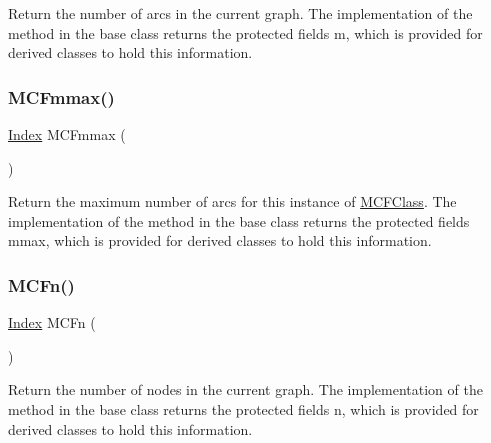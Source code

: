 Return the number of arcs in the current graph. The implementation of the method in the base class returns the protected fields {\ttfamily m}, which is provided for derived classes to hold this information. \mbox{\label{class_m_c_f_class_af63cff04d49de9f84b9ddc8585334690}} 
\subsubsection{\texorpdfstring{M\+C\+Fmmax()}{MCFmmax()}}
{\footnotesize\ttfamily \mbox{\hyperlink{class_m_c_f_class_ad53d6229d7ec28555a9c9c2fd9abf773}{Index}} M\+C\+Fmmax (\begin{DoxyParamCaption}\item[{void}]{ }\end{DoxyParamCaption})\hspace{0.3cm}{\ttfamily [inline]}}

Return the maximum number of arcs for this instance of \mbox{\hyperlink{class_m_c_f_class}{M\+C\+F\+Class}}. The implementation of the method in the base class returns the protected fields {\ttfamily mmax}, which is provided for derived classes to hold this information. \mbox{\label{class_m_c_f_class_a6438187f454e795c03a850bfab31be84}} 
\subsubsection{\texorpdfstring{M\+C\+Fn()}{MCFn()}}
{\footnotesize\ttfamily \mbox{\hyperlink{class_m_c_f_class_ad53d6229d7ec28555a9c9c2fd9abf773}{Index}} M\+C\+Fn (\begin{DoxyParamCaption}\item[{void}]{ }\end{DoxyParamCaption})\hspace{0.3cm}{\ttfamily [inline]}}

Return the number of nodes in the current graph. The implementation of the method in the base class returns the protected fields {\ttfamily n}, which is provided for derived classes to hold this information. \mbox{\label{class_m_c_f_class_acfb1bca6eb363c912c45c587f4bc214b}} 
